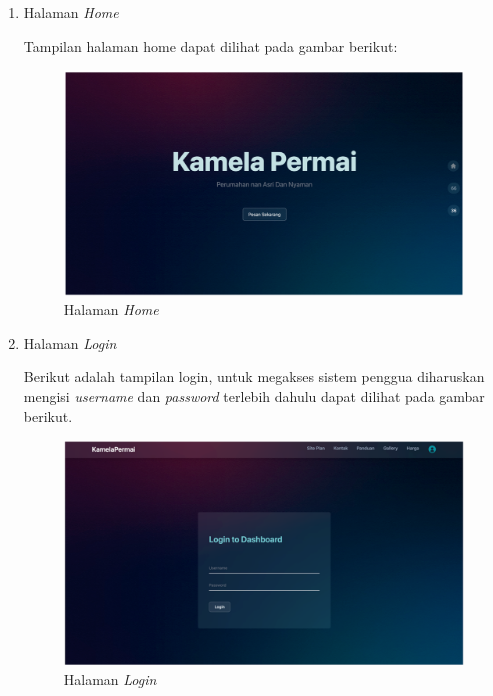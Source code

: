 \begin{enumerate}
    \item Halaman \textit{Home}
    \par Tampilan halaman home  dapat dilihat pada gambar berikut:

    \begin{figure}
        \centering
        \includegraphics[width=0.75\linewidth]{Implementasi/Home.png}
        \caption{Halaman \textit{Home}}
    \end{figure}
    
    \item Halaman \textit{Login}
    \par Berikut adalah tampilan login, untuk megakses sistem penggua diharuskan mengisi \textit{username} dan \textit{password} terlebih dahulu dapat dilihat pada gambar berikut.
    \begin{figure}
        \centering
        \includegraphics[width=0.75\linewidth]{Implementasi/Login.png}
        \caption{Halaman \textit{Login}}
    \end{figure}
    

\end{enumerate}
